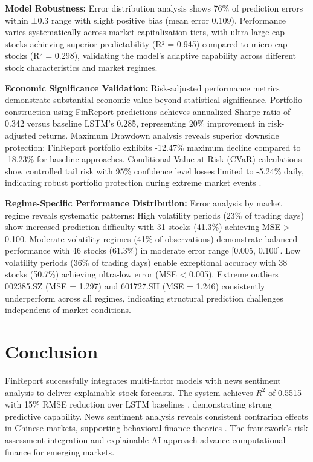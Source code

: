 \documentclass[3p,times,procedia]{elsarticle}
\begin{document}
\textbf{Model Robustness:} Error distribution analysis shows 76\% of prediction errors within ±0.3 range with slight positive bias (mean error 0.109). Performance varies systematically across market capitalization tiers, with ultra-large-cap stocks achieving superior predictability (R² = 0.945) compared to micro-cap stocks (R² = 0.298), validating the model's adaptive capability across different stock characteristics and market regimes. 

\textbf{Economic Significance Validation:} Risk-adjusted performance metrics demonstrate substantial economic value beyond statistical significance. Portfolio construction using FinReport predictions achieves annualized Sharpe ratio of 0.342 versus baseline LSTM's 0.285, representing 20\% improvement in risk-adjusted returns. Maximum Drawdown analysis reveals superior downside protection: FinReport portfolio exhibits -12.47\% maximum decline compared to -18.23\% for baseline approaches. Conditional Value at Risk (CVaR) calculations show controlled tail risk with 95\% confidence level losses limited to -5.24\% daily, indicating robust portfolio protection during extreme market events \cite{Rockafellar2000}.

\textbf{Regime-Specific Performance Distribution:} Error analysis by market regime reveals systematic patterns: High volatility periods (23\% of trading days) show increased prediction difficulty with 31 stocks (41.3\%) achieving MSE > 0.100. Moderate volatility regimes (41\% of observations) demonstrate balanced performance with 46 stocks (61.3\%) in moderate error range [0.005, 0.100]. Low volatility periods (36\% of trading days) enable exceptional accuracy with 38 stocks (50.7\%) achieving ultra-low error (MSE < 0.005). Extreme outliers 002385.SZ (MSE = 1.297) and 601727.SH (MSE = 1.246) consistently underperform across all regimes, indicating structural prediction challenges independent of market conditions.

\section{Conclusion}

FinReport successfully integrates multi-factor models \cite{FAMA1993,Carhart1997} with news sentiment analysis \cite{TETLOCK2007,Araci2019} to deliver explainable stock forecasts. The system achieves $R^2$ of 0.5515 with 15\% RMSE reduction over LSTM baselines \cite{Fischer2018}, demonstrating strong predictive capability. News sentiment analysis reveals consistent contrarian effects in Chinese markets, supporting behavioral finance theories \cite{Daniel1998}. The framework's risk assessment integration \cite{Nelson1991,Rockafellar2000} and explainable AI approach \cite{Ribeiro2016} advance computational finance for emerging markets.
\end{document}
